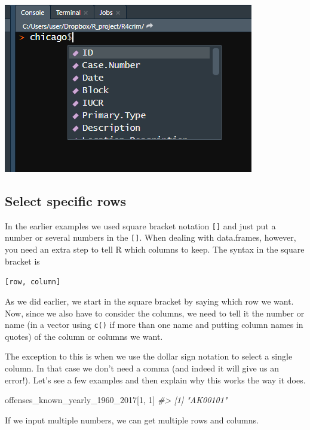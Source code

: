 \documentclass[
  12pt,
]{book}
\newenvironment{Shaded}{\begin{snugshade}}{\end{snugshade}}
\newcommand{\CommentTok}[1]{\textcolor[rgb]{0.37,0.37,0.37}{\textit{#1}}}
\newcommand{\DecValTok}[1]{\textcolor[rgb]{0.06,0.06,0.06}{#1}}
\newcommand{\NormalTok}[1]{#1}
\begin{document}
\includegraphics{images/tab_example.png}

\hypertarget{select-specific-rows}{%
\subsection{Select specific rows}\label{select-specific-rows}}

In the earlier examples we used square bracket notation \texttt{{[}{]}} and just put a number or several numbers in the \texttt{{[}{]}}. When dealing with data.frames, however, you need an extra step to tell R which columns to keep. The syntax in the square bracket is

\texttt{{[}row,\ column{]}}

As we did earlier, we start in the square bracket by saying which row we want. Now, since we also have to consider the columns, we need to tell it the number or name (in a vector using \texttt{c()} if more than one name and putting column names in quotes) of the column or columns we want.

The exception to this is when we use the dollar sign notation to select a single column. In that case we don't need a comma (and indeed it will give us an error!). Let's see a few examples and then explain why this works the way it does.

\begin{Shaded}
\begin{Highlighting}[]
\NormalTok{offenses\_known\_yearly\_}\DecValTok{1960}\NormalTok{\_}\DecValTok{2017}\NormalTok{[}\DecValTok{1}\NormalTok{, }\DecValTok{1}\NormalTok{]}
\CommentTok{\#\textgreater{} [1] "AK00101"}
\end{Highlighting}
\end{Shaded}

If we input multiple numbers, we can get multiple rows and columns.
\end{document}
